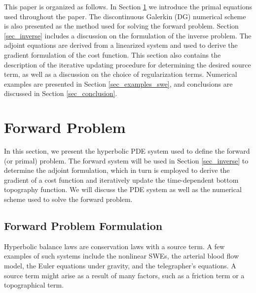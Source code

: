 This paper is organized as follows. In Section \ref{sec_forward} we introduce the primal equations used throughout the paper. The discontinuous Galerkin (DG) numerical scheme is also presented as the method used for solving the forward problem. Section \ref{sec_inverse} includes a discussion on the formulation of the inverse problem. The adjoint equations are derived from a linearized system and used to derive the gradient formulation of the cost function. This section also contains the description of the iterative updating procedure for determining the desired source term, as well as a discussion on the choice of regularization terms. Numerical examples are presented in Section \ref{sec_examples_swe}, and conclusions are discussed in Section \ref{sec_conclusion}. 

\section{Forward Problem} \label{sec_forward}

In this section, we present the hyperbolic PDE system used to define the forward (or primal) problem. The forward system will be used in Section \ref{sec_inverse} to determine the adjoint formulation, which in turn is employed to derive the gradient of a cost function and iteratively update the time-dependent bottom topography function. We will discuss the PDE system as well as the numerical scheme used to solve the forward problem.

\subsection{Forward Problem Formulation}

Hyperbolic balance laws are conservation laws with a source term. A few examples of such systems include the nonlinear SWEs, the arterial blood flow model, the Euler equations under gravity, and the telegrapher's equations. A source term might arise as a result of many factors, such as a friction term or a topographical term. 

